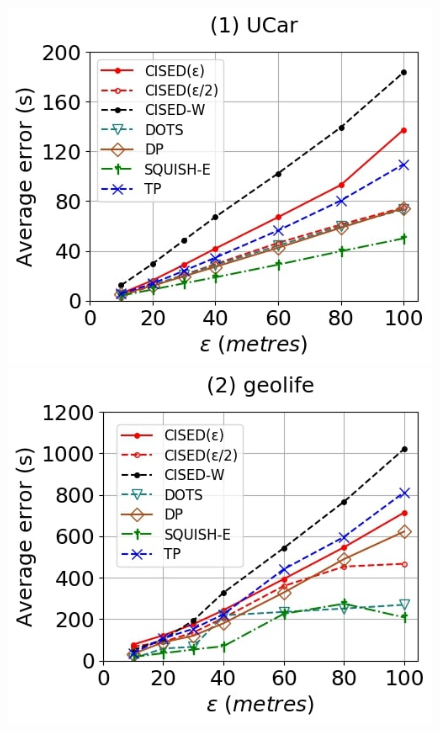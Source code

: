 {\begin{figure}[tb!]
	\centering
	\includegraphics[scale = 0.250]{Figures/Exp-when-SED-error-epsilon-service.jpg}\hspace{0.5ex}
	\includegraphics[scale = 0.250]{Figures/Exp-when-SED-error-epsilon-geolife.jpg}\hspace{0.5ex}

\end{figure}}
